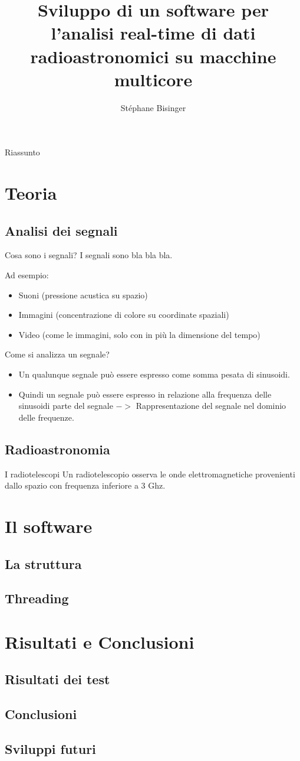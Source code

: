 \documentclass{beamer}
\title[Software per segnali radioastronomici]{Sviluppo di un software per l'analisi real-time di dati
radioastronomici su macchine multicore}
\author{St\'ephane Bisinger}
\begin{document}
\begin{frame}
\titlepage
\end{frame}
\begin{frame}{Riassunto}
\tableofcontents
\end{frame}
\section{Teoria}
\subsection{Analisi dei segnali}
\begin{frame}{Cosa sono i segnali?}
I segnali sono bla bla bla.

Ad esempio:
\begin{itemize}
    \item Suoni (pressione acustica su spazio)\pause
    \item Immagini (concentrazione di colore su coordinate spaziali)\pause
    \item Video (come le immagini, solo con in pi\`u la dimensione del tempo)
\end{itemize}
\end{frame}

\begin{frame}{Come si analizza un segnale?}
\begin{itemize}
    \item Un qualunque segnale pu\`o essere espresso come somma pesata di
    sinusoidi. \pause
    \item Quindi un segnale pu\`o essere espresso in relazione alla frequenza
    delle sinusoidi parte del segnale \pause $->$ Rappresentazione del segnale nel
    dominio delle frequenze.
\end{itemize}
\end{frame}

\subsection{Radioastronomia}
\begin{frame}{I radiotelescopi}
Un radiotelescopio osserva le onde elettromagnetiche provenienti dallo spazio
con frequenza inferiore a 3 Ghz.
\end{frame}
\section{Il software}
\subsection{La struttura}
\subsection{Threading}
\section{Risultati e Conclusioni}
\subsection{Risultati dei test}
\subsection{Conclusioni}
\subsection{Sviluppi futuri}
\end{document}
